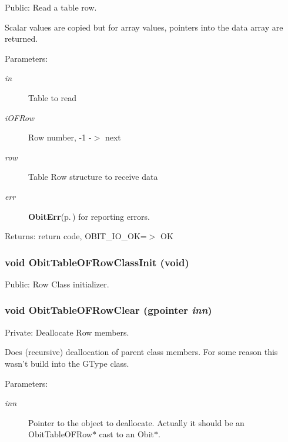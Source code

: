 Public: Read a table row. 

Scalar values are copied but for array values, pointers into the data array are returned. \begin{Desc}
\item[Parameters:]
\begin{description}
\item[{\em in}]Table to read \item[{\em i\-OFRow}]Row number, -1 -$>$ next \item[{\em row}]Table Row structure to receive data \item[{\em err}]{\bf Obit\-Err}{\rm (p.\,\pageref{structObitErr})} for reporting errors. \end{description}
\end{Desc}
\begin{Desc}
\item[Returns:]return code, OBIT\_\-IO\_\-OK=$>$ OK \end{Desc}
\subsubsection{\setlength{\rightskip}{0pt plus 5cm}void Obit\-Table\-OFRow\-Class\-Init (void)}\label{ObitTableOF_8c_a26}


Public: Row Class initializer. 

\subsubsection{\setlength{\rightskip}{0pt plus 5cm}void Obit\-Table\-OFRow\-Clear (gpointer {\em inn})}\label{ObitTableOF_8c_a7}


Private: Deallocate Row members. 

Does (recursive) deallocation of parent class members. For some reason this wasn't build into the GType class. \begin{Desc}
\item[Parameters:]
\begin{description}
\item[{\em inn}]Pointer to the object to deallocate. Actually it should be an Obit\-Table\-OFRow$\ast$ cast to an Obit$\ast$. \end{description}
\end{Desc}
